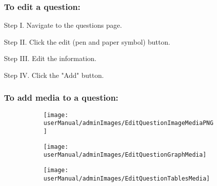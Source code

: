 \subsubsection{To edit a question:}
\begin{userManualItemlist}
    \item[Step I.] Navigate to the questions page.
    \item[Step II.] Click the edit (pen and paper symbol) button.
    \item[Step III.] Edit the information.
    \item[Step IV.] Click the "Add" button.  
\end{userManualItemlist}

\subsubsection{To add media to a question:}

\begin{figure}[H]
	\begin{subfigure}{0.70\linewidth}
		\texttt{[image: userManual/adminImages/EditQuestionImageMediaPNG]}
		\caption{}
		\label{fig:EditQuestionImageMedia}
	\end{subfigure}
	\begin{subfigure}{0.70\linewidth}
		\texttt{[image: userManual/adminImages/EditQuestionGraphMedia]}
		\caption{}
		\label{fig:EditQuestionGraphMedia}
    \end{subfigure}
	\begin{subfigure}{0.70\linewidth}
		\texttt{[image: userManual/adminImages/EditQuestionTablesMedia]}
		\caption{}
		\label{fig:EditQuestionTableMedia}
	\end{subfigure}
\end{figure}

